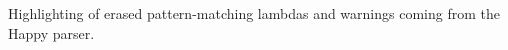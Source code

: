 \documentclass{article}
\begin{document}
\begin{code}
\AgdaSymbol{:}\AgdaSpace{}%
\AgdaSymbol{)}\AgdaSpace{}%
\AgdaSymbol{(}\AgdaSpace{}%
\AgdaSymbol{:}\AgdaSpace{}%
\AgdaSpace{}%
\AgdaSpace{}%
\AgdaSymbol{)}\AgdaSpace{}%
\AgdaSpace{}%
\AgdaSpace{}%
\AgdaSpace{}%
\AgdaSymbol{(}\AgdaSpace{}%
\AgdaSymbol{)}\<%
\\
%
\\[\AgdaEmptyExtraSkip]%
%
\>[2]\AgdaSpace{}%
\AgdaSymbol{:}\AgdaSpace{}%
\AgdaSpace{}%
\AgdaSymbol{\{}\AgdaSpace{}%
\AgdaSymbol{\}}\AgdaSpace{}%
\AgdaSpace{}%
\AgdaSpace{}%
\AgdaSpace{}%
\AgdaSpace{}%
\AgdaSpace{}%
\AgdaSpace{}%
\AgdaSpace{}%
\<%
\\
%
\>[2]\AgdaSpace{}%
\AgdaSymbol{\{}\AgdaSpace{}%
\AgdaSymbol{=}\AgdaSpace{}%
\AgdaDottedPattern{\AgdaSymbol{)}}\AgdaSymbol{\}}%
\>[23]%
\>[37]\AgdaSymbol{=}\AgdaSpace{}%
\<%
\\
%
\>[2]\AgdaSpace{}%
\AgdaSymbol{\{}\AgdaSpace{}%
\AgdaSymbol{=}\AgdaSpace{}%
\AgdaSpace{}%
\AgdaDottedPattern{\AgdaSymbol{)}}\AgdaSymbol{\}}\AgdaSpace{}%
\AgdaSymbol{(}\AgdaSpace{}%
\AgdaSpace{}%
\AgdaSpace{}%
\AgdaSymbol{)}\AgdaSpace{}%
\AgdaSymbol{=}\AgdaSpace{}%
\AgdaSpace{}%
\AgdaSymbol{\AgdaUnderscore{}}\AgdaSpace{}%
\AgdaSpace{}%
\AgdaSymbol{(}\AgdaSpace{}%
\AgdaSymbol{)}\<%
\end{code}

Highlighting of erased pattern-matching lambdas and warnings coming
from the Happy parser.
\end{document}
